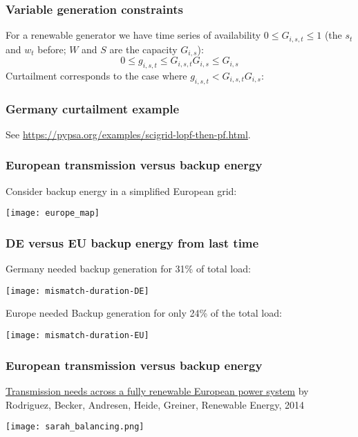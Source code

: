 \documentclass[10pt,dvipsnames]{beamer}
\begin{document}
\begin{frame}
  \frametitle{Variable generation constraints}

  For a renewable generator we have time series of availability $0\leq G_{i,s,t}\leq 1$ (the $s_t$ and $w_t$ before; $W$ and $S$ are the capacity $G_{i,s}$):
    \begin{equation*}
      0 \leq g_{i,s,t} \leq G_{i,s,t} G_{i,s} \leq  G_{i,s}
    \end{equation*}
    Curtailment corresponds to the case where $g_{i,s,t} < G_{i,s,t} G_{i,s}$:


\end{frame}

\begin{frame}
  \frametitle{Germany curtailment example}

  See \url{https://pypsa.org/examples/scigrid-lopf-then-pf.html}.

\end{frame}


\begin{frame}
  \frametitle{European transmission versus backup energy}

  Consider backup energy in a simplified European grid:

  \centering
  \texttt{[image: europe\_map]}

\end{frame}



\begin{frame}
  \frametitle{DE versus EU backup energy from last time}

  Germany needed backup generation for 31\% of total load:

  \centering
  \texttt{[image: mismatch-duration-DE]}


  Europe needed Backup generation for only 24\% of the total load:

  \centering
  \texttt{[image: mismatch-duration-EU]}

\end{frame}


\begin{frame}
  \frametitle{European transmission versus backup energy}

  \href{http://www.sciencedirect.com/science/article/pii/S0960148113005351}{Transmission needs across a fully renewable European power system} by Rodriguez, Becker, Andresen, Heide, Greiner, Renewable Energy, 2014

  \centering
  \texttt{[image: sarah\_balancing.png]}


\end{frame}
\end{document}
